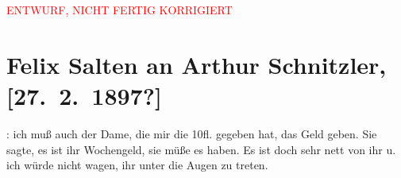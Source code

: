 
\begin{center}
            \textcolor{red}{ENTWURF, NICHT FERTIG KORRIGIERT}
                      \end{center}
            
         
         \renewcommand{\erwaehntePersonen}{Personen:  ?? [Frau, die Salten Geld leiht]}
         \renewcommand{\erwaehnteOrte}{Orte: Wien}
         \renewcommand{\erwaehnteWerke}{}
               \section[Felix Salten an Arthur Schnitzler, {[}27. 2. 1897?{]}]{ Felix Salten an Arthur Schnitzler, {[}27. 2. 1897?{]}}\nopagebreak{}\rehead{ }\begin{ledgroupsized}[t]{13cm}\normalsize\beginnumbering \toendnotes[C]{\smallbreak\pagebreak[2]} 
\toendnotes[C]{\smallbreak}\pstart
           \noindent{}{\pb}\label{K_L03359-1v}\label{K_L03359-1h}: ich muß auch der
               Dame, die mir die 10fl. gegeben hat, das Geld geben.
            Sie sagte, es ist ihr Wochengeld, sie müße es haben. Es ist doch sehr nett von ihr u.
            ich würde nicht wagen, ihr unter die Augen zu treten. \pend
           
         
         \endnumbering{}\end{ledgroupsized}\begin{anhang}\end{anhang}\newcommand{\dateiname}{L03359}\newcommand{\titel}{Felix Salten an Arthur Schnitzler, [27. 2. 1897?]}\newcommand{\editorInnen}{Martin Anton Müller und Laura Untner}
      